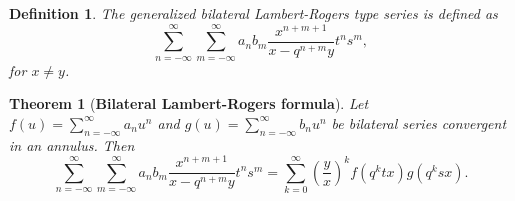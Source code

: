\documentclass[12pt]{article}
\newtheorem{theorem}{Theorem}
\newtheorem{definition}{Definition}
\begin{document}
\begin{definition}
The generalized bilateral Lambert-Rogers type series is defined as
\begin{equation}
    \sum_{n=-\infty}^{\infty}\sum_{m=-\infty}^{\infty}a_{n}b_{m}\frac{x^{n+m+1}}{x-q^{n+m}y}t^ns^m,
\end{equation}
for $x\neq y$.
\end{definition}

\begin{theorem}[{\bf Bilateral Lambert-Rogers formula}]\label{birogers}
Let $f(u)=\sum_{n=-\infty}^{\infty}a_nu^n$ and $g(u)=\sum_{n=-\infty}^{\infty}b_nu^n$ be bilateral series convergent in an annulus. Then
    \begin{equation}
        \sum_{n=-\infty}^{\infty}\sum_{m=-\infty}^{\infty}a_{n}b_{m}\frac{x^{n+m+1}}{x-q^{n+m}y}t^ns^m=\sum_{k=0}^{\infty}\left(\frac{y}{x}\right)^{k}f(q^ktx)g(q^ksx).
    \end{equation}
\end{theorem}
\end{document}
